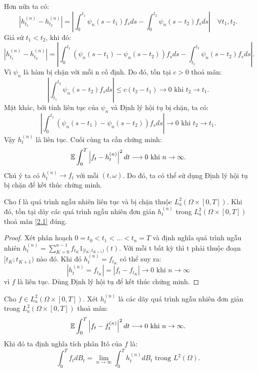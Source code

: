 Hơn nữa ta có: \[\left|h_{t_1}^{(n)} - h_{t_2}^{(n)} \right| = \left| \displaystyle \int_{0}^{t_1} \psi_n(s-t_1)f_sds - \displaystyle \int_{0}^{t_2} \psi_n(s-t_2)f_sds  \right| \quad \forall t_1,t_2 .\]
Giả sử $t_1 < t_2$, khi đó: \[\left|h_{t_1}^{(n)} - h_{t_2}^{(n)} \right| = \left| \displaystyle \int_{0}^{t_1} \left(\psi_n(s-t_1) - \psi_n(s-t_2) \right)f_sds - \displaystyle \int_{t_1}^{t_2} \psi_n(s-t_2)f_sds  \right|. \]
Vì $\psi_n$ là hàm bị chặn với mỗi n cố định. Do đó, tồn tại $c>0$ thoả mãn:
\[\left| \displaystyle \int_{t_1}^{t_2} \psi_n(s-t_2)f_sds \right| \leq c(t_2-t_1) \longrightarrow 0 \text{ khi } t_2 \to t_1. \]
Mặt khác, bởi tính liên tục của $\psi_n$ và Định lý hội tụ bị chặn, ta có:
\[\left|\displaystyle \int_{0}^{t_1} \left(\psi_n(s-t_1) - \psi_n(s-t_2) \right)f_sds \right| \longrightarrow 0 \text{ khi } t_2 \to t_1 . \]
Vậy $h_t^{(n)}$ là liên tục. Cuối cùng ta cần chứng minh: 
\[ \mathbb{E} \displaystyle \int_0^T \left|f_t - h_t^{(n)} \right|^2 dt \longrightarrow 0 \text{ khi } n \to \infty. \]
Chú ý ta có $h_t^{(n)} \to f_t$ với mỗi $(t, \omega)$. Do đó, ta có thể sử dụng Định lý hội tụ bị chặn để kết thúc chứng minh.
\begin{lem}
    Cho f là quá trình ngẫu nhiên liên tục và bị chặn thuộc $L_a^2(\Omega \times [0,T])$. Khi đó, tồn tại dãy các quá trình ngẫu nhiên đơn giản $h_t^{(n)}$ trong $L_a^2(\Omega \times [0,T])$ thoả mãn \eqref{2.1} đúng.
\end{lem}
\begin{proof}
    Xét phân hoạch $0 = t_0 < t_1 < \dots < t_n = T$ và định nghĩa quá trình ngẫu nhiên $h_t^{(n)} = \sum\limits_{K=0}^{n-1}f_{t_K}1_{[t_K;t_{K+1})}(t)$. Với mỗi t bất kỳ thì t phải thuộc đoạn $[t_K;t_{K+1})$ nào đó. Khi đó $h_t^{(n)} = f_{t_K}$ có thể suy ra: \[ \left|h_t^{(n)} = f_{t_K}\right| = |f_t-f_{t_K}| \longrightarrow 0 \text{ khi } n \to \infty\] vì $f$ là liên tục. Dùng Định lý hội tụ để kết thúc chứng minh.
\end{proof}
\begin{defn}
    Cho $ f \in L_a^2(\Omega \times [0,T])$. Xét $h_t^{(n)}$ là các dãy quá trình ngẫu nhiên đơn giản trong $L_a^2(\Omega \times [0,T])$ thoả mãn: \[ \mathbb{E} \displaystyle \int_0^T \left|f_t - f_t^{(n)} \right|^2 dt \longrightarrow 0 \text{ khi } n \to \infty. \]
    Khi đó ta định nghĩa tích phân Itô của $f$ là:
    \[ \displaystyle \int_0^T f_t dB_t = \lim\limits_{n \to \infty} \displaystyle \int_0^T h_t^{(n)} dB_t \text{ trong } L^2(\Omega).\]
\end{defn}
